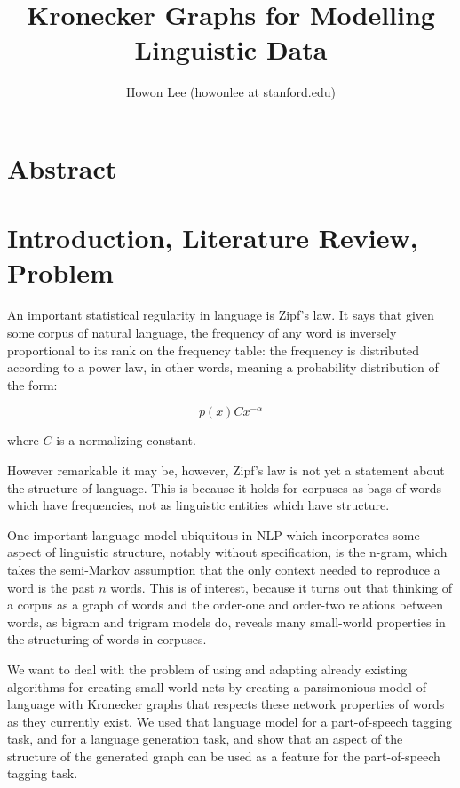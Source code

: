 \documentclass[12pt]{article}
\begin{document}
\title{Kronecker Graphs for Modelling Linguistic Data}
\author{Howon Lee (howonlee at stanford.edu)}
\maketitle

\section{Abstract}


\section{Introduction, Literature Review, Problem}

An important statistical regularity in language is Zipf's law. It says that given some corpus of natural language, the frequency of any word is inversely proportional to its rank on the frequency table: the frequency is distributed according to a power law, in other words, meaning a probability distribution of the form:

$$p(x) Cx^{-\alpha} $$

where $C$ is a normalizing constant.

However remarkable it may be, however, Zipf's law is not yet a statement about the structure of language. This is because it holds for corpuses as bags of words which have frequencies, not as linguistic entities which have structure. \cite{smallworldlang}

One important language model ubiquitous in NLP which incorporates some aspect of linguistic structure, notably without specification, is the n-gram, which takes the semi-Markov assumption that the only context needed to reproduce a word is the past $n$ words. This is of interest, because it turns out that thinking of a corpus as a graph of words and the order-one and order-two relations between words, as bigram and trigram models do, reveals many small-world properties in the structuring of words in corpuses.

We want to deal with the problem of using and adapting already existing algorithms for creating small world nets by creating a parsimonious model of language with Kronecker graphs that respects these network properties of words as they currently exist. We used that language model for a part-of-speech tagging task, and for a language generation task, and show that an aspect of the structure of the generated graph can be used as a feature for the part-of-speech tagging task.
\end{document}
